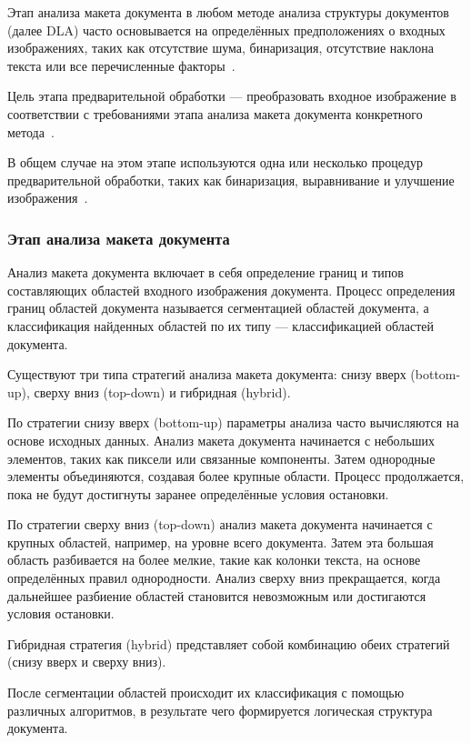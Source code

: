 Этап анализа макета документа в любом методе анализа структуры документов (далее DLA) часто основывается на определённых предположениях о входных изображениях, таких как отсутствие шума, бинаризация, отсутствие наклона текста или все перечисленные факторы~\cite{dla-survey, dla-book}.

Цель этапа предварительной обработки --- преобразовать входное изображение в соответствии с требованиями этапа анализа макета документа конкретного метода~\cite{dla-survey, dla-book}.

В общем случае на этом этапе используются одна или несколько процедур предварительной обработки, таких как бинаризация, выравнивание и улучшение изображения~\cite{dla-survey, primer}.

\subsubsection{Этап анализа макета документа}

Анализ макета документа включает в себя определение границ и типов составляющих областей входного изображения документа.
Процесс определения границ областей документа называется сегментацией областей документа, а классификация найденных областей по их типу --- классификацией областей документа.~\cite{dla-book}

Существуют три типа стратегий анализа макета документа: снизу вверх (bottom-up), сверху вниз (top-down) и гибридная (hybrid).

По стратегии снизу вверх (bottom-up) параметры анализа часто вычисляются на основе исходных данных.
Анализ макета документа начинается с небольших элементов, таких как пиксели или связанные компоненты.
Затем однородные элементы объединяются, создавая более крупные области.
Процесс продолжается, пока не будут достигнуты заранее определённые условия остановки.

По стратегии сверху вниз (top-down) анализ макета документа начинается с крупных областей, например, на уровне всего документа.
Затем эта большая область разбивается на более мелкие, такие как колонки текста, на основе определённых правил однородности.
Анализ сверху вниз прекращается, когда дальнейшее разбиение областей становится невозможным или достигаются условия остановки.

Гибридная стратегия (hybrid) представляет собой комбинацию обеих стратегий (снизу вверх и сверху вниз).~\cite{dla-survey}

После сегментации областей происходит их классификация с помощью различных алгоритмов, в результате чего формируется логическая структура документа.

